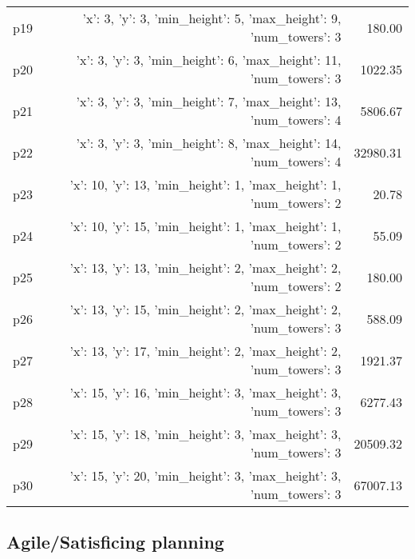 \documentclass{article}
\begin{document}
\begin{center}
\begin{tabular}{@{}l|r|r@{}}
  p19&{'x': 3, 'y': 3, 'min\_height': 5, 'max\_height': 9, 'num\_towers': 3}&180.00\\
  p20&{'x': 3, 'y': 3, 'min\_height': 6, 'max\_height': 11, 'num\_towers': 3}&1022.35\\
  p21&{'x': 3, 'y': 3, 'min\_height': 7, 'max\_height': 13, 'num\_towers': 4}&5806.67\\
  p22&{'x': 3, 'y': 3, 'min\_height': 8, 'max\_height': 14, 'num\_towers': 4}&32980.31\\
  p23&{'x': 10, 'y': 13, 'min\_height': 1, 'max\_height': 1, 'num\_towers': 2}&20.78\\
  p24&{'x': 10, 'y': 15, 'min\_height': 1, 'max\_height': 1, 'num\_towers': 2}&55.09\\
  p25&{'x': 13, 'y': 13, 'min\_height': 2, 'max\_height': 2, 'num\_towers': 2}&180.00\\
  p26&{'x': 13, 'y': 15, 'min\_height': 2, 'max\_height': 2, 'num\_towers': 3}&588.09\\
  p27&{'x': 13, 'y': 17, 'min\_height': 2, 'max\_height': 2, 'num\_towers': 3}&1921.37\\
  p28&{'x': 15, 'y': 16, 'min\_height': 3, 'max\_height': 3, 'num\_towers': 3}&6277.43\\
  p29&{'x': 15, 'y': 18, 'min\_height': 3, 'max\_height': 3, 'num\_towers': 3}&20509.32\\
  p30&{'x': 15, 'y': 20, 'min\_height': 3, 'max\_height': 3, 'num\_towers': 3}&67007.13
                            \end{tabular}
                            \end{center}
                    

                                \subsection*{Agile/Satisficing planning}
                                
\end{document}
